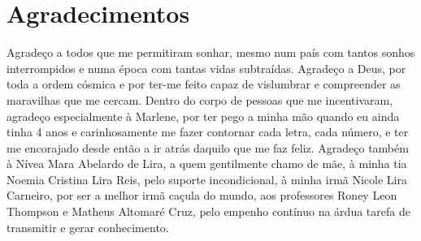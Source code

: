 \chapter*{Agradecimentos}

Agradeço a todos que me permitiram sonhar, mesmo num país com tantos sonhos interrompidos e numa época com tantas vidas subtraídas. Agradeço a Deus, por toda a ordem cósmica e por ter-me feito capaz de vislumbrar e compreender as maravilhas que me cercam. Dentro do corpo de pessoas que me incentivaram, agradeço especialmente à Marlene, por ter pego a minha mão quando eu ainda tinha 4 anos e carinhosamente me fazer contornar cada letra, cada número, e ter me encorajado desde então a ir atrás daquilo que me faz feliz. Agradeço também à Nívea Mara Abelardo de Lira, a quem gentilmente chamo de mãe, à minha tia Noemia Cristina Lira Reis, pelo suporte incondicional, à minha irmã Nicole Lira Carneiro, por ser a melhor irmã caçula do mundo, aos professores Roney Leon Thompson e Matheus Altomaré Cruz, pelo empenho contínuo na árdua tarefa de transmitir e gerar conhecimento.

